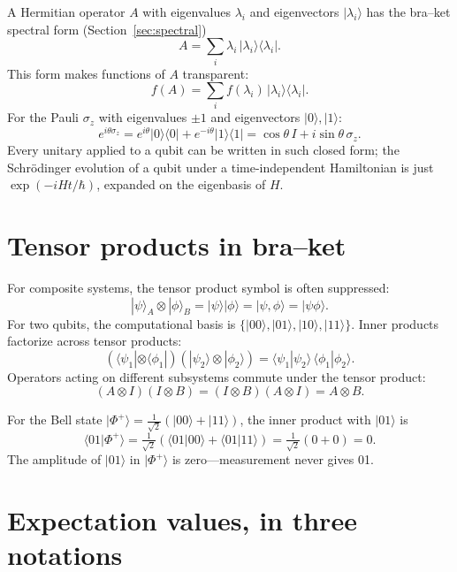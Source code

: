 A Hermitian operator $A$ with eigenvalues $\lambda_i$ and eigenvectors $|\lambda_i\rangle$ has the bra--ket spectral form (Section~\ref{sec:spectral})
\[
  A = \sum_i \lambda_i\,|\lambda_i\rangle\langle\lambda_i|.
\]
This form makes functions of $A$ transparent:
\[
  f(A) = \sum_i f(\lambda_i)\,|\lambda_i\rangle\langle\lambda_i|.
\]
For the Pauli $\sigma_z$ with eigenvalues $\pm 1$ and eigenvectors $|0\rangle,|1\rangle$:
\[
  e^{i\theta\sigma_z} = e^{i\theta}|0\rangle\langle 0| + e^{-i\theta}|1\rangle\langle 1| = \cos\theta\,I + i\sin\theta\,\sigma_z.
\]
Every unitary applied to a qubit can be written in such closed form; the Schr\"odinger evolution of a qubit under a time-independent Hamiltonian is just $\exp(-iHt/\hbar)$, expanded on the eigenbasis of $H$.

\section{Tensor products in bra--ket}

For composite systems, the tensor product symbol is often suppressed:
\[
  |\psi\rangle_A \otimes |\phi\rangle_B = |\psi\rangle|\phi\rangle = |\psi,\phi\rangle = |\psi\phi\rangle.
\]
For two qubits, the computational basis is $\{|00\rangle, |01\rangle, |10\rangle, |11\rangle\}$. Inner products factorize across tensor products:
\[
  (\langle\psi_1|\otimes\langle\phi_1|)(|\psi_2\rangle\otimes|\phi_2\rangle) = \langle\psi_1|\psi_2\rangle\,\langle\phi_1|\phi_2\rangle.
\]
Operators acting on different subsystems commute under the tensor product:
\[
  (A \otimes I)(I \otimes B) = (I \otimes B)(A \otimes I) = A \otimes B.
\]

\begin{example}
For the Bell state $|\Phi^+\rangle = \tfrac{1}{\sqrt 2}(|00\rangle + |11\rangle)$, the inner product with $|01\rangle$ is
\[
  \langle 01|\Phi^+\rangle = \tfrac{1}{\sqrt 2}(\langle 01|00\rangle + \langle 01|11\rangle) = \tfrac{1}{\sqrt 2}(0+0) = 0.
\]
The amplitude of $|01\rangle$ in $|\Phi^+\rangle$ is zero---measurement never gives 01.
\end{example}

\section{Expectation values, in three notations}

